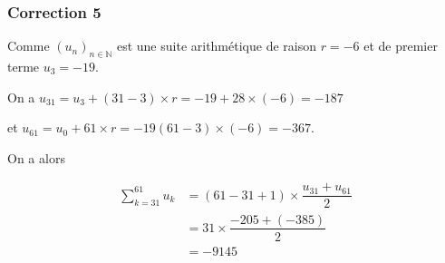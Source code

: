\documentclass[15pt, mathserif]{beamer}
\begin{document}
\begin{frame}
\vspace{-10mm}
	\frametitle{Correction 5}
Comme $(u_n)_{n\in\mathbb{N}}$ est une suite arithmétique de raison $r = -6$ et de premier terme $u_3=-19$.

 On a $u_{31}= u_3+(31-3)\times r = -19+28\times\left(-6\right) = -187$ 

 et $u_{61} = u_0 + 61\times r = -19(61-3)\times\left(-6\right) = -367$.

On a alors

\begin{align*}\displaystyle\sum_{k=31}^{61} u_k &= (61-31+1) \times \dfrac{u_{31}+u_{61}}{2}\\
	&=31\times \dfrac{-205+\left(-385\right)}{2}\\
	&=-9145
\end{align*}\end{frame}
\end{document}
